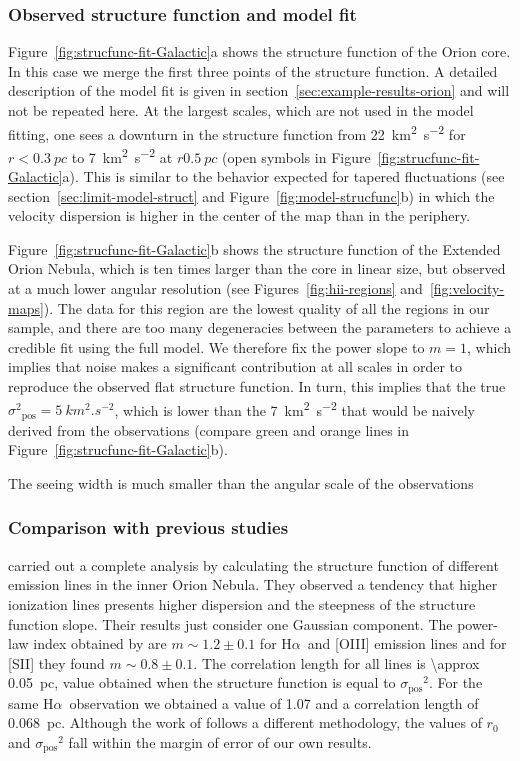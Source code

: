\documentclass[fleqn,usenatbib, useAMS, a4paper]{mnras}
\newcommand\pos{\ensuremath{_{\mathrm{pos}}}}
\newcommand\halpha{H${\alpha}$}
\begin{document}
\subsubsection{Observed structure function and model fit}
\label{sec:observ-struct-funct-orion}

Figure~\ref{fig:strucfunc-fit-Galactic}a shows the structure function of the Orion core.
In this case we merge the first three points of the structure function.
A detailed description of the model fit is given in
section~\ref{sec:example-results-orion} and will
not be repeated here.
At the largest scales, which are not used in the model fitting,
one sees a downturn in the structure function from
\SI{22}{km^{2}.s^{-2}} for \(r < \SI{0.3}{pc}\) to
\SI{7}{km^{2}.s^{-2}} at \(r  \SI{0.5}{pc}\)
(open symbols in Figure~\ref{fig:strucfunc-fit-Galactic}a).
This is similar to the behavior expected for tapered fluctuations
(see section~\ref{sec:limit-model-struct} and Figure~\ref{fig:model-strucfunc}b)
in which the velocity dispersion is higher in the center of the map
than in the periphery.

Figure~\ref{fig:strucfunc-fit-Galactic}b shows the structure function of the Extended Orion Nebula, which is ten times larger than the core in linear size,
but observed at a much lower angular resolution
(see Figures~\ref{fig:hii-regions} and~\ref{fig:velocity-maps}).
The data for this region are the lowest quality of all the regions in
our sample, and there are too many degeneracies between the parameters
to achieve a credible fit using the full model.
We therefore fix the power slope to \(m = 1\),
which implies that noise makes a significant contribution at all scales
in order to reproduce the observed flat structure function.
In turn, this implies that the true \(\sigma^2\pos = \SI{5}{km^2.s^{-2}}\),
which is lower than the \SI{7}{km^2.s^{-2}}
that would be naively derived from the observations
(compare green and orange lines in Figure~\ref{fig:strucfunc-fit-Galactic}b).

The seeing width is much smaller than the angular scale of the observations
\subsubsection{Comparison with previous studies}
\label{sec:comparison-orion}

\citet{arthur2016turbulence} carried out a complete analysis by calculating the structure function of different emission lines in the inner Orion Nebula.
They observed a tendency that higher ionization lines presents higher  dispersion and the steepness of the structure function slope. 
Their results just consider one Gaussian component. 
The power-law index obtained by \citet{arthur2016turbulence} are \(m \sim 1.2 \pm 0.1\) for \halpha\ and [OIII] emission lines and for [SII] they found \(m \sim 0.8 \pm 0.1\). 
The correlation length for all lines is \SI{\approx 0.05}{pc}, value obtained when the structure function is equal to \(\sigma\pos^2\).
For the same \halpha\ observation we obtained a value of \num{1.07} and a correlation length of \SI{0.068}{pc}. 
Although the work of \citet{arthur2016turbulence} follows a different methodology, the values of \(r_0\) and \(\sigma\pos^2\) fall within the margin of error of our own results.
\end{document}
